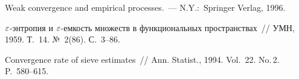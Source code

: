 \begin{multicols}{2}
{{\begin{thebibliography}{99}
 Weak convergence and empirical processes.~--- N.Y.:~Springer Verlag, 1996.

 $\varepsilon$-энтро\-пия и $\varepsilon$-ем\-кость множеств в функциональных пространствах~// 
УМН, 1959. Т.~14. №~2(86). С.~3--86.

\label{end\stat}

  Convergence rate of sieve estimates~// Ann. Statist., 1994. Vol.~22. No.\,2. P.~580--615.
\end{thebibliography}
}
}

\end{multicols}